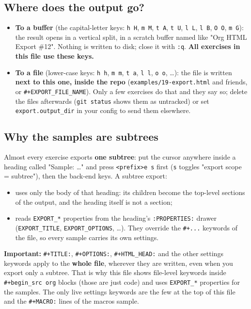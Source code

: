 \subsection{Where does the output go?}
\label{sec:org42f874c}
\begin{itemize}
\item \textbf{To a buffer} (the capital-letter keys: \texttt{h H}, \texttt{m M}, \texttt{t A}, \texttt{t U},
\texttt{l L}, \texttt{l B}, \texttt{O O}, \texttt{m G}): the result opens in a vertical split, in a
scratch buffer named like "Org HTML Export \#12". Nothing is written to
disk; close it with \texttt{:q}. \textbf{All exercises in this file use these keys.}
\item \textbf{To a file} (lower-case keys: \texttt{h h}, \texttt{m m}, \texttt{t a}, \texttt{l l}, \texttt{o o}, \ldots{}):
the file is written \textbf{next to this one, inside the repo}
(\texttt{examples/19-export.html} and friends, or \texttt{\#+EXPORT\_FILE\_NAME}). Only a
few exercises do that and they say so; delete the files afterwards
(\texttt{git status} shows them as untracked) or set \texttt{export.output\_dir} in
your config to send them elsewhere.
\end{itemize}
\subsection{Why the samples are subtrees}
\label{sec:org38bae4b}
Almost every exercise exports \textbf{one subtree}: put the cursor anywhere inside
a heading called "Sample: \ldots{}" and press \texttt{<prefix>e s} first (\texttt{s} toggles
"export scope = subtree"), then the back-end keys. A subtree export:
\begin{itemize}
\item uses only the body of that heading: its children become the top-level
sections of the output, and the heading itself is not a section;
\item reads \texttt{EXPORT\_*} properties from the heading's \texttt{:PROPERTIES:} drawer
(\texttt{EXPORT\_TITLE}, \texttt{EXPORT\_OPTIONS}, \ldots{}). They override the \texttt{\#+...}
keywords of the file, so every sample carries its own settings.
\end{itemize}

\textbf{Important:} \texttt{\#+TITLE:}, \texttt{\#+OPTIONS:}, \texttt{\#+HTML\_HEAD:} and the other
settings keywords apply to the \textbf{whole file}, wherever they are written,
even when you export only a subtree. That is why this file shows
file-level keywords inside \texttt{\#+begin\_src org} blocks (those are just code)
and uses \texttt{EXPORT\_*} properties for the samples. The only live settings
keywords are the few at the top of this file and the \texttt{\#+MACRO:} lines of
the macros sample.

